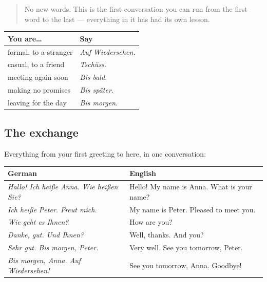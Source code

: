 \label{lesson:GE-C04-practice}



\begin{quote}
No new words. This is the first conversation you can run from the first word to the last — everything in it has had its own lesson.
\end{quote}

\begin{grammarlens}[title={Grammar Lens: which farewell, when}]
\noindent
\begin{tabularx}{\linewidth}{@{}>{\raggedright\arraybackslash}X>{\raggedright\arraybackslash}X@{}}
\toprule
\textbf{You are…} & \textbf{Say} \\
\midrule
formal, to a stranger & \emph{Auf Wiedersehen.} \\
casual, to a friend & \emph{Tschüss.} \\
meeting again soon & \emph{Bis bald.} \\
making no promises & \emph{Bis später.} \\
leaving for the day & \emph{Bis morgen.} \\
\bottomrule
\end{tabularx}
\end{grammarlens}

\subsection*{The exchange}
Everything from your first greeting to here, in one conversation:

\noindent
\begin{tabularx}{\linewidth}{@{}>{\raggedright\arraybackslash}X>{\raggedright\arraybackslash}X@{}}
\toprule
\textbf{German} & \textbf{English} \\
\midrule
\emph{Hallo! Ich heiße Anna. Wie heißen Sie?} & Hello! My name is Anna. What is your name? \\
\emph{Ich heiße Peter. Freut mich.} & My name is Peter. Pleased to meet you. \\
\emph{Wie geht es Ihnen?} & How are you? \\
\emph{Danke, gut. Und Ihnen?} & Well, thanks. And you? \\
\emph{Sehr gut. Bis morgen, Peter.} & Very well. See you tomorrow, Peter. \\
\emph{Bis morgen, Anna. Auf Wiedersehen!} & See you tomorrow, Anna. Goodbye! \\
\bottomrule
\end{tabularx}


